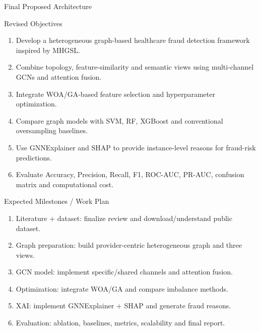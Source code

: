 \documentclass[aspectratio=169,11pt]{beamer}
\begin{document}
\begin{frame}{Final Proposed Architecture}
\centering
{}\end{frame}

\begin{frame}{Revised Objectives}
\begin{enumerate}
\item Develop a heterogeneous graph-based healthcare fraud detection framework inspired by MHGSL.
\item Combine topology, feature-similarity and semantic views using multi-channel GCNs and attention fusion.
\item Integrate WOA/GA-based feature selection and hyperparameter optimization.
\item Compare graph models with SVM, RF, XGBoost and conventional oversampling baselines.
\item Use GNNExplainer and SHAP to provide instance-level reasons for fraud-risk predictions.
\item Evaluate Accuracy, Precision, Recall, F1, ROC-AUC, PR-AUC, confusion matrix and computational cost.
\end{enumerate}\end{frame}

\begin{frame}{Expected Milestones / Work Plan}
\begin{enumerate}
\item Literature + dataset: finalize review and download/understand public dataset.
\item Graph preparation: build provider-centric heterogeneous graph and three views.
\item GCN model: implement specific/shared channels and attention fusion.
\item Optimization: integrate WOA/GA and compare imbalance methods.
\item XAI: implement GNNExplainer + SHAP and generate fraud reasons.
\item Evaluation: ablation, baselines, metrics, scalability and final report.
\end{enumerate}\end{frame}
\end{document}
